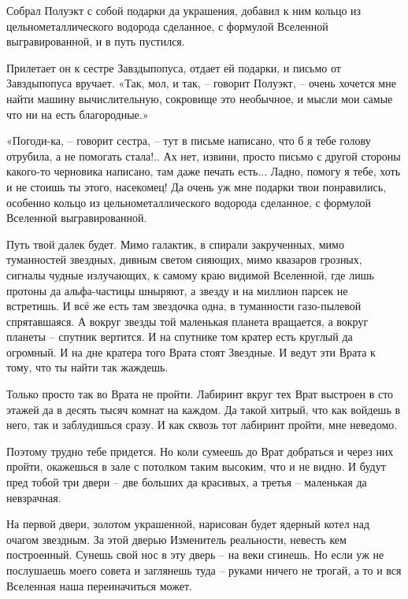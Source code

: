 \documentclass[ebook,oneside,final,openright]{memoir}
\begin{document}
\par
Собрал Полуэкт с собой подарки да украшения, добавил к ним кольцо из цельнометаллического водорода сделанное, с формулой Вселенной выгравированной, и в путь пустился.\par
\par
Прилетает он к сестре Завздыпопуса, отдает ей подарки, и письмо от Завздыпопуса вручает. «Так, мол, и так, – говорит Полуэкт, – очень хочется мне найти машину вычислительную, сокровище это необычное, и мысли мои самые что ни на есть благородные.»\par
\par
«Погоди-ка, – говорит сестра, – тут в письме написано, что б я тебе голову отрубила, а не помогать стала!.. Ах нет, извини, просто письмо с другой стороны какого-то черновика написано, там даже печать есть... Ладно, помогу я тебе, хоть и не стоишь ты этого, насекомец! Да очень уж мне подарки твои понравились, особенно кольцо из цельнометаллического водорода сделанное, с формулой Вселенной выгравированной.\par
\par
Путь твой далек будет. Мимо галактик, в спирали закрученных, мимо туманностей звездных, дивным светом сияющих, мимо квазаров грозных, сигналы чудные излучающих, к самому краю видимой Вселенной, где лишь протоны да альфа-частицы шныряют, а звезду и на миллион парсек не встретишь. И всё же есть там звездочка одна, в туманности газо-пылевой спрятавшаяся. А вокруг звезды той маленькая планета вращается, а вокруг планеты – спутник вертится. И на спутнике том кратер есть круглый да огромный. И на дне кратера того Врата стоят Звездные. И ведут эти Врата к тому, что ты найти так жаждешь.\par
\par
Только просто так во Врата не пройти. Лабиринт вкруг тех Врат выстроен в сто этажей да в десять тысяч комнат на каждом. Да такой хитрый, что как войдешь в него, так и заблудишься сразу. И как сквозь тот лабиринт пройти, мне неведомо.\par
\par
Поэтому трудно тебе придется. Но коли сумеешь до Врат добраться и через них пройти, окажешься в зале с потолком таким высоким, что и не видно. И будут пред тобой три двери – две больших да красивых, а третья – маленькая да невзрачная.\par
\par
На первой двери, золотом украшенной, нарисован будет ядерный котел над очагом звездным. За этой дверью Изменитель реальности, невесть кем построенный. Сунешь свой нос в эту дверь – на веки сгинешь. Но если уж не послушаешь моего совета и заглянешь туда – руками ничего не трогай, а то и вся Вселенная наша переиначиться может.\par
\end{document}
